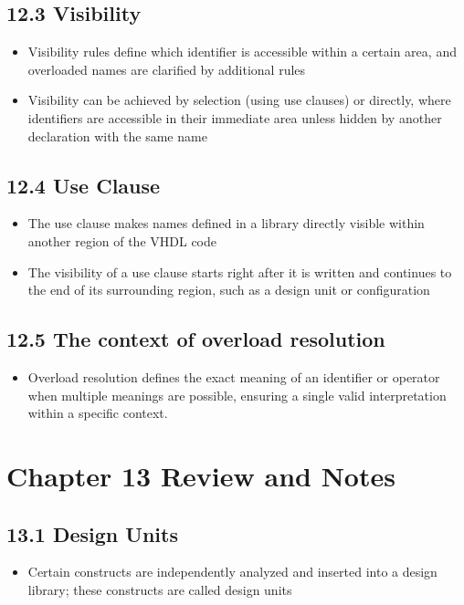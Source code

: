 \documentclass[a4paper,12pt]{article}
\begin{document}
	\subsection*{12.3 Visibility}
	\begin{itemize}
		\item Visibility rules define which identifier is accessible within a certain area, and overloaded names are clarified by additional rules
		\item Visibility can be achieved by selection (using use clauses) or directly, where identifiers are accessible in their immediate area unless hidden by another declaration with the same name
	\end{itemize}
	
	\subsection*{12.4 Use Clause}
	\begin{itemize}
		\item The use clause makes names defined in a library directly visible within another region of the VHDL code
		\item The visibility of a use clause starts right after it is written and continues to the end of its surrounding region, such as a design unit or configuration
	\end{itemize}
	
	\subsection*{12.5 The context of overload resolution}
	\begin{itemize}
		\item Overload resolution defines the exact meaning of an identifier or operator when multiple meanings are possible, ensuring a single valid interpretation within a specific context.
	\end{itemize}
	
	
	
	\section*{Chapter 13 Review and Notes}
	
	\subsection*{13.1 Design Units}
	\begin{itemize}
		\item Certain constructs are independently analyzed and inserted into a design library; these constructs are called
		design units
	\end{itemize}
	
\end{document}
